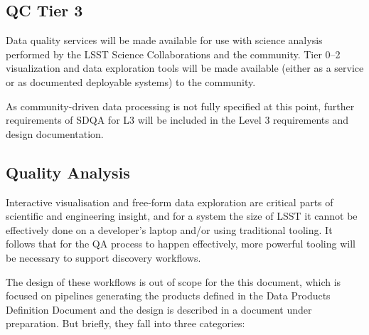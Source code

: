 \documentclass[DM,toc,lsstdraft]{lsstdoc}
\begin{document}
\subsection{QC Tier 3}
\label{sec:qaQA3}

Data quality services will be made available for use with science analysis performed by the LSST Science Collaborations and the community. Tier 0--2 visualization and data exploration tools will be made available (either as a service or as documented deployable systems) to the community.

As community-driven data processing is not fully specified at this point, further requirements of SDQA for L3 will be included in the Level 3 requirements and design documentation.


\subsection{Quality Analysis}
\label{sec:qaInteractiveVis}

Interactive visualisation and free-form data exploration are critical parts of scientific and engineering insight, and for a system the size of LSST it cannot be effectively done on a developer's laptop and/or using traditional tooling. It follows that for the QA process to happen effectively, more powerful tooling will be necessary to support discovery workflows.

The design of these workflows is out of scope for the this document, which is focused on pipelines generating the products defined in the Data Products Definition Document and the design is described in a document under preparation. But briefly, they fall into three categories:
\end{document}
